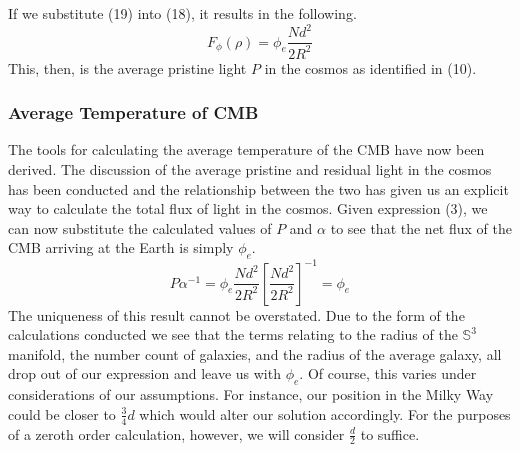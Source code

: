 \documentclass[a4paper]{article}
\begin{document}
    If we substitute (19) into (18), it results in the following.
    \begin{equation}
        F_{\phi}(\rho) = \phi_e \frac{N d^2}{2 R^2} 
    \end{equation}
    This, then, is the average pristine light $P$ in the cosmos as identified
    in (10).

    \subsubsection{Average Temperature of CMB}
    The tools for calculating the average temperature of the CMB have now been
    derived. The discussion of the average pristine and residual light in the
    cosmos has been conducted and the relationship between the two has given us
    an explicit way to calculate the total flux of light in the cosmos. Given
    expression (3), we can now substitute the calculated values of $P$ and
    $\alpha$ to see that the net flux of the CMB arriving at the Earth is
    simply $\phi_e$.
    \begin{equation}
        P\alpha^{-1} = \phi_e \frac{N d^2}{2R^2} \left[\frac{N d^2}{2
        R^2}\right]^{-1} = \phi_e
    \end{equation}
    The uniqueness of this result cannot be overstated. Due to the form of the
    calculations conducted we see that the terms relating to the radius of the
    $\mathbb{S}^3$ manifold, the number count of galaxies, and the radius of
    the average galaxy, all drop out of our expression and leave us with
    $\phi_e$. Of course, this varies under considerations of our assumptions.
    For instance, our position in the Milky Way could be closer to
    $\frac{3}{4}d$ which would alter our solution accordingly. For the purposes
    of a zeroth order calculation, however, we will consider $\frac{d}{2}$ to
    suffice.
\end{document}
